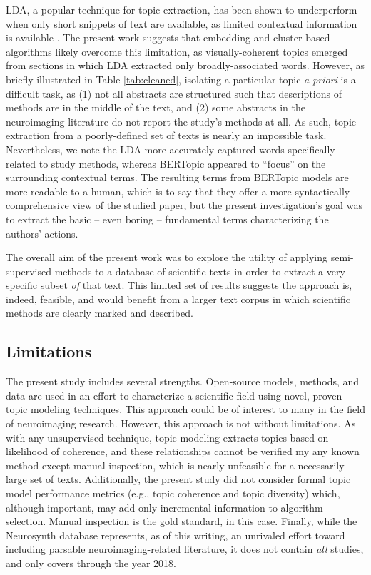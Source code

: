 LDA, a popular technique for topic extraction, has been shown to underperform when only short snippets of text are available, as limited contextual information is available \cite{QiangEtAl2016}. The present work suggests that embedding and cluster-based algorithms likely overcome this limitation, as visually-coherent topics emerged from sections in which LDA extracted only broadly-associated words. However, as briefly illustrated in Table \ref{tab:cleaned}, isolating a particular topic \textit{a priori} is a difficult task, as (1) not all abstracts are structured such that descriptions of methods are in the middle of the text, and (2) some abstracts in the neuroimaging literature do not report the study's methods at all. As such, topic extraction from a poorly-defined set of texts is nearly an impossible task. Nevertheless, we note the LDA more accurately captured words specifically related to study methods, whereas BERTopic appeared to ``focus'' on the surrounding contextual terms. The resulting terms from BERTopic models are more readable to a human, which is to say that they offer a more syntactically comprehensive view of the studied paper, but the present investigation's goal was to extract the basic -- even boring -- fundamental terms characterizing the authors' actions. 

The overall aim of the present work was to explore the utility of applying semi-supervised methods to a database of scientific texts in order to extract a very specific subset \emph{of} that text. This limited set of results suggests the approach is, indeed, feasible, and would benefit from a larger text corpus in which scientific methods are clearly marked and described. 

\subsection{Limitations}
The present study includes several strengths. Open-source models, methods, and data are used in an effort to characterize a scientific field using novel, proven topic modeling techniques. This approach could be of interest to many in the field of neuroimaging research. However, this approach is not without limitations. As with any unsupervised technique, topic modeling extracts topics based on likelihood of coherence, and these relationships cannot be verified my any known method except manual inspection, which is nearly unfeasible for a necessarily large set of texts. Additionally, the present study did not consider formal topic model performance metrics (e.g., topic coherence and topic diversity) which, although important, may add only incremental information to algorithm selection. Manual inspection is the gold standard, in this case. Finally, while the Neurosynth database represents, as of this writing, an unrivaled effort toward including parsable neuroimaging-related literature, it does not contain \textit{all} studies, and only covers through the year 2018.


